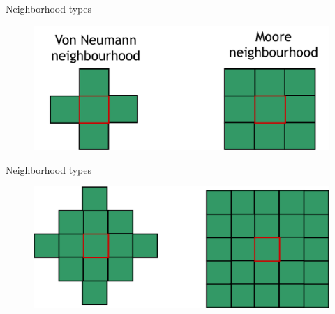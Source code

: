 \documentclass{eecslides}
\begin{document}

	\begin{frame}{Neighborhood types}

		\begin{figure}[!t]
			\includegraphics[height=0.35\textheight]{neighbourhood}
		\end{figure}

	\end{frame}


	\begin{frame}{Neighborhood types}

		\begin{figure}[!t]
			\includegraphics[height=0.35\textheight]{high_neighbourhood}
		\end{figure}

	\end{frame}

\end{document}
